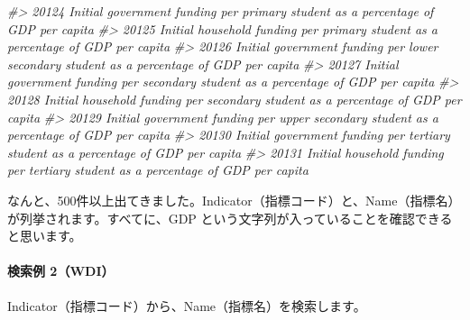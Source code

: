 \documentclass[
]{bxjsbook}
\newenvironment{Shaded}{\begin{snugshade}}{\end{snugshade}}
\newcommand{\AttributeTok}[1]{\textcolor[rgb]{0.77,0.63,0.00}{#1}}
\newcommand{\CommentTok}[1]{\textcolor[rgb]{0.56,0.35,0.01}{\textit{#1}}}
\newcommand{\ConstantTok}[1]{\textcolor[rgb]{0.00,0.00,0.00}{#1}}
\newcommand{\FunctionTok}[1]{\textcolor[rgb]{0.00,0.00,0.00}{#1}}
\newcommand{\NormalTok}[1]{#1}
\newcommand{\StringTok}[1]{\textcolor[rgb]{0.31,0.60,0.02}{#1}}
\theoremstyle{definition}
\theoremstyle{definition}
\theoremstyle{definition}
\theoremstyle{definition}
\theoremstyle{remark}
\begin{document}
\begin{Shaded}
\begin{Highlighting}[]
\CommentTok{\#\textgreater{} 20124                                                                                          Initial government funding per primary student as a percentage of GDP per capita}
\CommentTok{\#\textgreater{} 20125                                                                                           Initial household funding per primary student as a percentage of GDP per capita}
\CommentTok{\#\textgreater{} 20126                                                                                  Initial government funding per lower secondary student as a percentage of GDP per capita}
\CommentTok{\#\textgreater{} 20127                                                                                        Initial government funding per secondary student as a percentage of GDP per capita}
\CommentTok{\#\textgreater{} 20128                                                                                         Initial household funding per secondary student as a percentage of GDP per capita}
\CommentTok{\#\textgreater{} 20129                                                                                  Initial government funding per upper secondary student as a percentage of GDP per capita}
\CommentTok{\#\textgreater{} 20130                                                                                         Initial government funding per tertiary student as a percentage of GDP per capita}
\CommentTok{\#\textgreater{} 20131                                                                                          Initial household funding per tertiary student as a percentage of GDP per capita}
\end{Highlighting}
\end{Shaded}

なんと、500件以上出てきました。Indicator（指標コード）と、Name（指標名）が列挙されます。すべてに、GDP という文字列が入っていることを確認できると思います。

\hypertarget{ux691cux7d22ux4f8b-2wdi}{%
\paragraph{検索例 2（WDI）}\label{ux691cux7d22ux4f8b-2wdi}}

Indicator（指標コード）から、Name（指標名）を検索します。

\begin{Shaded}
\end{Shaded}
\end{document}
